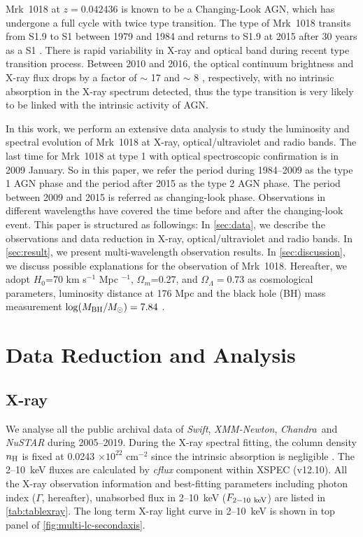 \documentclass[twocolumn]{aastex63}
\newcommand{\xmm}{{\em XMM-Newton}}
\newcommand{\nustar}{{\em NuSTAR }}
\newcommand{\chandra}{{\em Chandra}}
\newcommand{\swift}{{\small \it Swift}}
\begin{document}
Mrk~1018 at $z=0.042436$ is known to be a Changing-Look AGN, which has undergone a full cycle with twice type transition. The type of Mrk~1018 transits from S1.9 to S1 between 1979 and 1984 \citep{1986ApJ...311..135C} and returns to S1.9 at 2015 after 30 years as a S1 \citep[see also][]{2016A&A...593L...8M,2016A&A...593L...9H,2017A&A...607L...9K}. There is rapid variability in X-ray and optical band during recent type transition process. Between 2010 and 2016, the optical continuum brightness and X-ray flux drops by a factor of $\sim$ 17 and $\sim$ 8 \citep{2016A&A...593L...9H}, respectively, with no intrinsic absorption in the X-ray spectrum detected, thus the type transition is very likely to be linked with the intrinsic activity of AGN.

In this work, we perform an extensive data analysis to study the luminosity and spectral evolution of Mrk~1018 at X-ray, optical/ultraviolet and radio bands. The last time for Mrk~1018 at type 1 with optical spectroscopic confirmation is in 2009 January. So in this paper, we refer the period during 1984--2009 as the type 1 AGN phase and the period after 2015 as the type 2 AGN phase. The period between 2009 and 2015 is referred as changing-look phase. Observations in different wavelengths have covered the time before and after the changing-look event. This paper is structured as followings: In \autoref{sec:data}, we describe the observations and data reduction in X-ray, optical/ultraviolet and radio bands. In \autoref{sec:result}, we present multi-wavelength observation results. In \autoref{sec:discussion}, we discuss possible explanations for the observation of Mrk~1018. Hereafter, we adopt $H_0$=70 km s$^{-1}$ Mpc $^{-1}$, $\Omega_{m}$=0.27, and $\Omega_{\Lambda}=0.73 $ as cosmological parameters, luminosity distance at 176 Mpc and the black hole (BH) mass measurement $\log(M_{\rm{BH}}/M_{\odot})=7.84$ \citep{2017MNRAS.472.3492E,2018MNRAS.480.3898N}. 


\section{Data Reduction and Analysis}\label{sec:data}
\subsection{X-ray}
We analyse all the public archival data of \swift, \xmm, \chandra ~and \nustar during 2005--2019. During the X-ray spectral fitting, the column density $n_{\rm{H}}$ is fixed at 0.0243 $\times 10^{22}$ cm$^{-2}$ since the intrinsic absorption is negligible \citep[see ][]{2016A&A...593L...9H}. The 2--10~keV fluxes are calculated by {\it cflux} component within {\scriptsize XSPEC} (v12.10). All the X-ray observation information and best-fitting parameters including photon index ($\Gamma$, hereafter), unabsorbed flux in 2--10~keV ($F_{\rm{2-10~keV}}$) are listed in \autoref{tab:tablexray}. The long term X-ray light curve in 2--10~keV is shown in top panel of \autoref{fig:multi-lc-secondaxis}.
\end{document}
